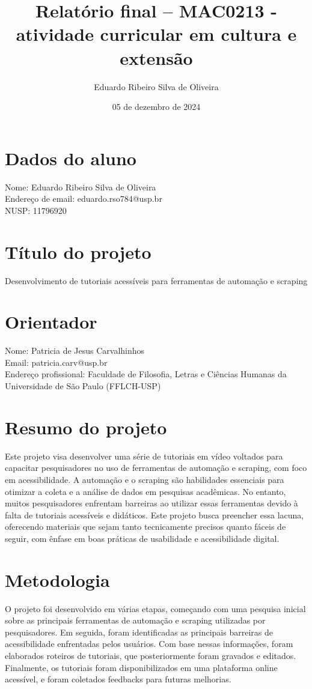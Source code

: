 \documentclass{article}
\title{Relatório final – MAC0213 - atividade curricular em cultura e extensão}
\author{Eduardo Ribeiro Silva de Oliveira}
\date{05 de dezembro de 2024}
\begin{document}
\maketitle

\section*{Dados do aluno}
Nome: Eduardo Ribeiro Silva de Oliveira\\
Endereço de email: eduardo.rso784@usp.br\\
NUSP: 11796920

\section*{Título do projeto}
Desenvolvimento de tutoriais acessíveis para ferramentas de automação e scraping

\section*{Orientador}
Nome: Patricia de Jesus Carvalhinhos\\
Email: patricia.carv@usp.br\\
Endereço profissional: Faculdade de Filosofia, Letras e Ciências Humanas da Universidade de São Paulo (FFLCH-USP)

\section*{Resumo do projeto}
Este projeto visa desenvolver uma série de tutoriais em vídeo voltados para capacitar pesquisadores no uso de ferramentas de automação e scraping, com foco em acessibilidade. A automação e o scraping são habilidades essenciais para otimizar a coleta e a análise de dados em pesquisas acadêmicas. No entanto, muitos pesquisadores enfrentam barreiras ao utilizar essas ferramentas devido à falta de tutoriais acessíveis e didáticos. Este projeto busca preencher essa lacuna, oferecendo materiais que sejam tanto tecnicamente precisos quanto fáceis de seguir, com ênfase em boas práticas de usabilidade e acessibilidade digital.

\section*{Metodologia}
O projeto foi desenvolvido em várias etapas, começando com uma pesquisa inicial sobre as principais ferramentas de automação e scraping utilizadas por pesquisadores. Em seguida, foram identificadas as principais barreiras de acessibilidade enfrentadas pelos usuários. Com base nessas informações, foram elaborados roteiros de tutoriais, que posteriormente foram gravados e editados. Finalmente, os tutoriais foram disponibilizados em uma plataforma online acessível, e foram coletados feedbacks para futuras melhorias.
\end{document}
